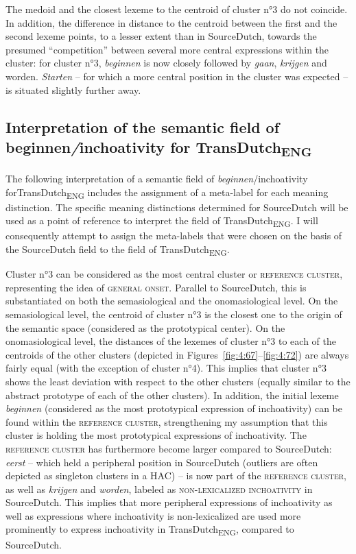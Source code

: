 The medoid and the closest lexeme to the centroid of cluster n°3 do not coincide. In addition, the difference in distance to the centroid between the first and the second lexeme points, to a lesser extent than in SourceDutch, towards the presumed ``competition'' between several more central expressions within the cluster: for cluster n°3, \textit{beginnen} is now closely followed by \textit{gaan}, \textit{krijgen} and worden. \textit{Starten} – for which a more central position in the cluster was expected – is situated slightly further away.

\subsection{Interpretation of the semantic field of beginnen\textit{/}inchoativity for TransDutch\textsubscript{ENG}}\label{sec:4.3.4}  
The following interpretation of a semantic field of \textit{beginnen}/inchoativity for\linebreak TransDutch\textsubscript{ENG} includes the assignment of a meta-label for each meaning distinction. The specific meaning distinctions determined for SourceDutch will be used as a point of reference to interpret the field of TransDutch\textsubscript{ENG}. I will consequently attempt to assign the meta-labels that were chosen on the basis of the SourceDutch field to the field of TransDutch\textsubscript{ENG}.

Cluster n°3 can be considered as the most central cluster or \textsc{reference cluster}, representing the idea of \textsc{general onset}. Parallel to SourceDutch, this is substantiated on both the semasiological and the onomasiological level. On the semasiological level, the centroid of cluster n°3 is the closest one to the origin of the semantic space (considered as the prototypical center). On the onomasiological level, the distances of the lexemes of cluster n°3 to each of the centroids of the other clusters (depicted in Figures~\ref{fig:4:67}--\ref{fig:4:72}) are always fairly equal (with the exception of cluster n°4). This implies that cluster n°3 shows the least deviation with respect to the other clusters (equally similar to the abstract prototype of each of the other clusters). In addition, the initial lexeme \textit{beginnen} (considered as the most prototypical expression of inchoativity) can be found within the \textsc{reference cluster}, strengthening my assumption that this cluster is holding the most prototypical expressions of inchoativity. The \textsc{reference cluster} has furthermore become larger compared to SourceDutch: \textit{eerst} – which held a peripheral position in SourceDutch (outliers are often depicted as singleton clusters in a HAC) – is now part of the \textsc{reference cluster}, as well as \textit{krijgen} and \textit{worden}, labeled as {\textsc{non-lexicalized inchoativity}} in SourceDutch. This implies that more peripheral expressions of inchoativity as well as expressions where inchoativity is non-lexicalized are used more prominently to express inchoativity in TransDutch\textsubscript{ENG}, compared to SourceDutch.


